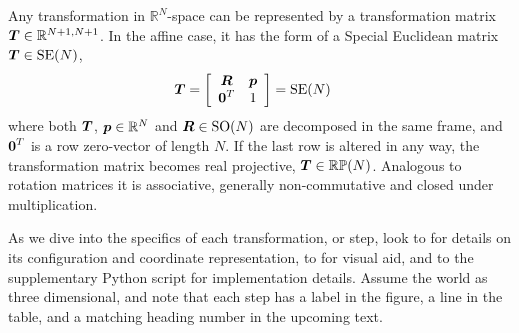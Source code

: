 Any transformation in $\mathbb{R}^N$-space can be represented by a transformation matrix $\boldsymbol{T} \in \mathbb{R}^{N+1,N+1}$. In the affine case, it has the form of a Special Euclidean matrix $\boldsymbol{T}\in\mathrm{SE}(N)$,
%
\begin{align}
\dvec{T} &= 
\left[\begin{array}{c c}
 \mat{R}  & \dvec{p} \\%
 \dvec{0}^T  &  1
\end{array}\right] = \mathrm{SE}(N)\label{eq_homogeneous_affine_transform}
\end{align}
%
where both $\boldsymbol{T}$, $\boldsymbol{p}\in\mathbb{R}^N$ and $\boldsymbol{R}\in\mathrm{SO}(N)$ are decomposed in the same frame, and $\boldsymbol{0}^T$ is a row zero-vector of length $N$. If the last row is altered in any way, the transformation matrix becomes real projective, $\boldsymbol{T}\in\mathbb{RP}(N)$. Analogous to rotation matrices it is associative, generally non-commutative and closed under multiplication. %

As we dive into the specifics of each transformation, or step, look to  for details on its configuration and coordinate representation, to  for visual aid, and to the supplementary Python script for implementation details. Assume the world as three dimensional, and note that each step has a label in the figure, a line in the table, and a matching heading number in the upcoming text.



%


